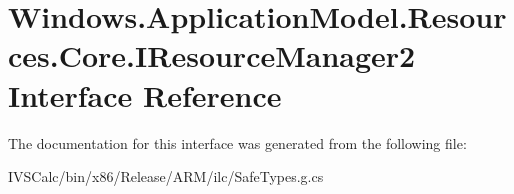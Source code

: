 \hypertarget{interface_windows_1_1_application_model_1_1_resources_1_1_core_1_1_i_resource_manager2}{}\section{Windows.\+Application\+Model.\+Resources.\+Core.\+I\+Resource\+Manager2 Interface Reference}
\label{interface_windows_1_1_application_model_1_1_resources_1_1_core_1_1_i_resource_manager2}


The documentation for this interface was generated from the following file\+:\begin{DoxyCompactItemize}
\item 
I\+V\+S\+Calc/bin/x86/\+Release/\+A\+R\+M/ilc/Safe\+Types.\+g.\+cs\end{DoxyCompactItemize}
